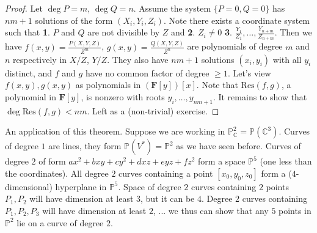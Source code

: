 \documentclass[12pt]{article}
\newcommand{\F}{\mathbf{F}}
\newcommand{\C}{\mathbb{C}}
\renewcommand{\P}{\mathbb{P}}
\newcommand{\Res}{\mathrm{Res}}
\begin{document}
    \begin{proof}
        Let $\deg P = m$, $\deg Q = n$. Assume the system $\{P = 0, Q = 0\}$ has $nm + 1$ solutions of the form $(X_i, Y_i, Z_i)$. Note there exists a coordinate system such that \textbf{1}. $P$ and $Q$ are not divisible by $Z$ and \textbf{2}. $Z_i \neq 0$ \textbf{3}. $\frac{Y_1}{Z_1}, \dots, \frac{Y_{n+m}}{Z_{n+m}}$. Then we have $f(x, y) = \frac{P(X, Y, Z)}{Z^m}$, $g(x, y) = \frac{Q(X, Y, Z)}{Z^n}$ are polynomials of degree $m$ and $n$ respectively in $X/Z$, $Y/Z$. They also have $nm + 1$ solutions $(x_i, y_i)$ with all $y_i$ distinct, and $f$ and $g$ have no common factor of degree $\geq 1$. Let's view $f(x, y), g(x, y)$ as polynomials in $(\F[y])[x]$. Note that $\Res(f, g)$, a polynomial in $\F[y]$, is nonzero with roots $y_i, \dots, y_{nm+1}$. It remains to show that $\deg \Res(f, g) < nm$. Left as a (non-trivial) exercise. 
    \end{proof}
    An application of this theorem. Suppose we are working in $\P_\C^2 = \P(\C^3)$. Curves of degree $1$ are lines, they form $\P(V^*) = \P^2$ as we have seen before. Curves of degree $2$ of form $ax^2 + bxy + cy^2 + dxz + eyz + fz^2$ form a space $\P^5$ (one less than the coordinates). All degree $2$ curves containing a point $[x_0, y_0, z_0]$ form a ($4$-dimensional) hyperplane in $\P^5$. Space of degree $2$ curves containing $2$ points $P_1, P_2$ will have dimension at least $3$, but it can be $4$. Degree $2$ curves containing $P_1, P_2, P_3$ will have dimension at least $2$, ... we thus can show that any $5$ points in $\P^2$ lie on a curve of degree $2$. 
\end{document}

